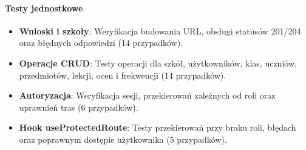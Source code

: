 \documentclass[12pt,a4paper]{article}
\begin{document}
\paragraph{Testy jednostkowe}
\begin{itemize}
    \item \textbf{Wnioski i szkoły}: Weryfikacja budowania URL, obsługi statusów 201/204 oraz błędnych odpowiedzi (14 przypadków).
    \item \textbf{Operacje CRUD}: Testy operacji dla szkół, użytkowników, klas, uczniów, przedmiotów, lekcji, ocen i frekwencji (14 przypadków).
    \item \textbf{Autoryzacja}: Weryfikacja sesji, przekierowań zależnych od roli oraz uprawnień tras (6 przypadków).
    \item \textbf{Hook useProtectedRoute}: Testy przekierowań przy braku roli, błędach oraz poprawnym dostępie użytkownika (5 przypadków).
\end{itemize}
\end{document}
